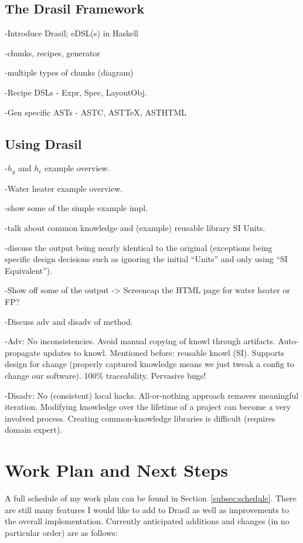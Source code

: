 \documentclass{article}
\begin{document}
\subsection{The Drasil Framework}

-Introduce Drasil; eDSL(s) in Haskell

-chunks, recipes, generator

-multiple types of chunks (diagram)

-Recipe DSLs - Expr, Spec, LayoutObj.

-Gen specific ASTs - ASTC, ASTTeX, ASTHTML

\subsection{Using Drasil}

-$h_g$ and $h_c$ example overview.

-Water heater example overview.

-show some of the simple example impl.

-talk about common knowledge and (example) reusable library SI Units.

-discuss the output being nearly identical to the original (exceptions being specific design decisions such as ignoring the initial ``Units'' and only using ``SI Equivalent'').

-Show off some of the output -> Screencap the HTML page for water heater or FP?

-Discuss adv and disadv of method.

-Adv: No inconsistencies. Avoid manual copying of knowl through artifacts. Auto-propagate updates to knowl. Mentioned before: reusable knowl (SI). Supports design for change (properly captured knowledge means we just tweak a config to change our software). 100\% traceability. Pervasive bugs!

-Disadv: No (consistent) local hacks. All-or-nothing approach removes meaningful iteration. Modifying knowledge over the lifetime of a project can become a very involved process. Creating common-knowledge libraries is difficult (requires domain expert).


\section{Work Plan and Next Steps}

A full schedule of my work plan can be found in Section~\ref{subsec:schedule}. There are still many features I would like to add to Drasil as well as improvements to the overall implementation. Currently anticipated additions and changes (in no particular order) are as follows:
\end{document}
